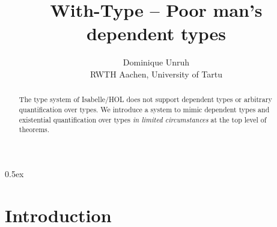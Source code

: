 \documentclass[11pt,a4paper]{article}
\begin{document}
\title{With-Type -- Poor man's dependent types}
\author{Dominique Unruh\\
 \footnotesize RWTH Aachen, University of Tartu}
\maketitle

\begin{abstract}
  The type system of Isabelle/HOL does not support dependent types or arbitrary quantification over types.
  We introduce a system to mimic dependent types and existential quantification over types \emph{in limited circumstances} at the top level of theorems.
\end{abstract}

\tableofcontents

\parindent 0pt\parskip 0.5ex

\section{Introduction}
\end{document}
